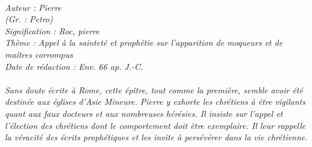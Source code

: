 \BFont
\noindent\hrulefill
{\footnotesize
\textit{
\bigskip
{\centering{}
\\Auteur : Pierre
\\(Gr. : Petro)
\\Signification : Roc, pierre
\\Thème : Appel à la sainteté et prophétie sur l'apparition de moqueurs et de maîtres corrompus
\\Date de rédaction : Env. 66 ap. J.-C.\\}
}
\textit{
\\Sans doute écrite à Rome, cette épître, tout comme la première, semble avoir été destinée aux églises d'Asie Mineure. Pierre y exhorte les chrétiens à être vigilants quant aux faux docteurs et aux nombreuses hérésies. Il insiste sur l'appel et l'élection des chrétiens dont le comportement doit être exemplaire. Il leur rappelle la véracité des écrits prophétiques et les invite à persévérer dans la vie chrétienne.\bigskip
}
}
\par\nobreak\noindent\hrulefill
